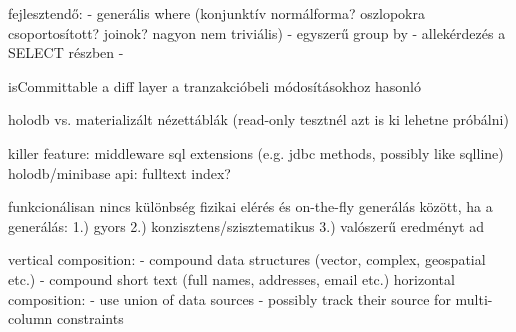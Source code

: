 \documentclass[
    parspace,
    noindent,
    nohyp,
]{elteiktdk}[2023/04/10]
\begin{document}
{fejlesztendő:
- generális where (konjunktív normálforma? oszlopokra csoportosított? joinok? nagyon nem triviális)
- egyszerű group by
- allekérdezés a SELECT részben
- 

isCommittable
a diff layer a tranzakcióbeli módosításokhoz hasonló

holodb vs. materializált nézettáblák
(read-only tesztnél azt is ki lehetne próbálni)

killer feature: middleware
sql extensions (e.g. jdbc methods, possibly like sqlline)
holodb/minibase api: fulltext index?

funkcionálisan nincs különbség fizikai elérés és on-the-fly generálás között, ha a generálás:
1.) gyors
2.) konzisztens/szisztematikus
3.) valószerű eredményt ad

vertical composition: 
- compound data structures (vector, complex, geospatial etc.)
- compound short text (full names, addresses, email etc.)
horizontal composition:
- use union of data sources
- possibly track their source for multi-column constraints
}
\end{document}
